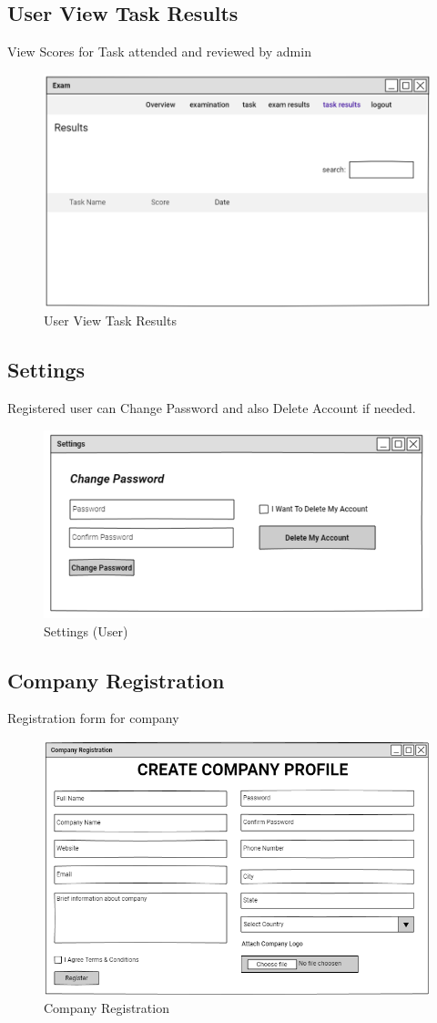\documentclass[a4paper,12pt]{report}
\begin{document}
\subsection {User View Task Results}
View Scores for Task attended and reviewed by admin
\begin{figure}[bph]
	\centering
	\includegraphics[width=.6\linewidth ]{img/user/usrtskrslt}
	\caption{User View Task Results}
\end{figure}
\pagebreak

\pagebreak
\subsection {Settings}
Registered user can Change Password and also Delete Account if needed.
\begin{figure}[bph]
	\centering
	\includegraphics[width=.6\linewidth ]{img/user/changeuserpassword}
	\caption{Settings (User)}
\end{figure}

\subsection {Company Registration}
Registration form for company
\begin{figure}[bph]
	\centering
	\includegraphics[width=.8\linewidth ]{img/company/company_registration}
	\caption{Company Registration}
\end{figure}
\pagebreak
\end{document}
